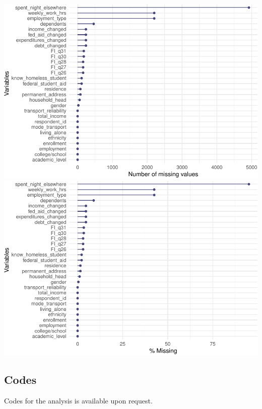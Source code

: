 \documentclass[
  10pt,
]{article}
\begin{document}
\includegraphics{phase2_report_files/figure-latex/unnamed-chunk-23-2}
\includegraphics{phase2_report_files/figure-latex/unnamed-chunk-23-3}

\hypertarget{codes}{%
\subsection{Codes}\label{codes}}

Codes for the analysis is available upon request.
\end{document}
